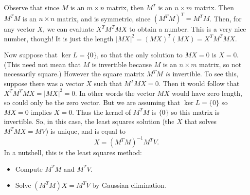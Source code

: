 Observe that since $M$ is an $m\times n$ matrix, then $M^T$ is an $n\times m$ matrix.  Then $M^TM$ is an $n\times n$ matrix, and is symmetric, since $(M^TM)^T=M^TM$.  Then, for any vector $X$, we can evaluate $X^TM^TMX$ to obtain a number.  This is a very nice number, though!  It is just the length $|MX|^2 = (MX)^T(MX)=X^TM^TMX$.


Now suppose that $\ker L=\{0\}$, so that the only solution to $MX=0$ is $X=0$. (This need not mean that $M$ is invertible because $M$ is an $n\times m $ matrix, so not necessarily square.) 
However the square matrix $M^TM$ {\itshape is} invertible. To see this, suppose there was a vector $X$ such that 
$M^T M X=0$. Then it would follow that $X^T M^T M X = |M X|^2=0$. In other words the vector $MX$ would have zero length, so could only be the zero vector. But we are assuming that $\ker L=\{0\}$ so $MX=0$ implies $X=0$. Thus the kernel of $M^TM$ is $\{0\}$ so this matrix is invertible.
So, in this case, the least squares solution (the $X$ that solves $M^TMX=MV$) is unique, and is equal to 
\[
X = (M^TM)^{-1}M^TV.
\]
In a nutshell, this is the least squares method:

\begin{itemize}
\item Compute $M^TM$ and $M^TV$.
\item Solve $(M^TM)X=M^TV$ by Gaussian elimination.
\end{itemize}


